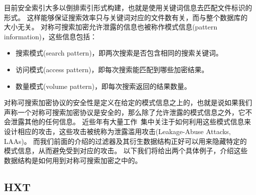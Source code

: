 目前安全索引大多以倒排索引形式构建，也就是使用关键词信息去匹配文件标识的形式。
这样能够保证搜索效率只与关键词对应的文件数有关，而与整个数据库的大小无关。
对称可搜索加密允许泄露的信息也被称作模式信息(pattern information)，这些信息包括：
\begin{itemize}
  \item 搜索模式(search pattern)，即两次搜索是否包含相同的搜索关键词。
  \item 访问模式(access pattern)，即每次搜索能匹配到哪些加密结果。
  \item 数量模式(volume pattern)，即每次搜索返回的结果数量。
\end{itemize}
对称可搜索加密协议的安全性是定义在给定的模式信息之上的，也就是说如果我们声称一个对称可搜索加密协议是安全的，那么除了允许泄露的模式信息之外，它不会泄露其他的任何信息。
近些年有大量工作~\cite{cash2015leakageabuse,grubbs2018pump,gui2019encrypted,blackstone2020revisiting,ning2021leap,kamara2022sok}集中关注于如何利用这些模式信息来设计相应的攻击，这些攻击被统称为泄露滥用攻击(Leakage-Abuse Attacks, LAAs)。
而我们前面的介绍的过滤器及其衍生数据结构正好可以用来隐藏特定的模式信息，从而避免受到对应的攻击。
以下我们将给出两个具体例子，介绍这些数据结构是如何用到对称可搜索加密之中的。


\subsection{HXT}

